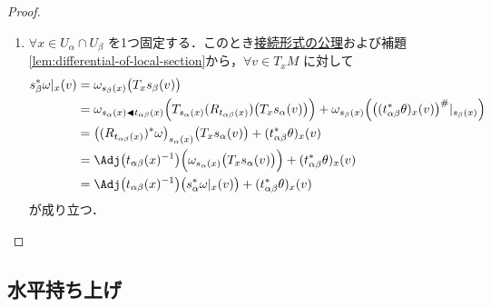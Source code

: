 \documentclass[TQFT_main]{subfiles}
\begin{document}
\begin{proof}
\begin{enumerate}
        \item $\forall x \in U_\alpha \cap U_\beta$ を1つ固定する．このとき\hyperref[def:connection]{接続形式の公理}および補題\ref{lem:differential-of-local-section}から，$\forall v \in T_x M$ に対して
        \begin{align}
            s_\beta^* \omega|_x (v) 
            &= \omega_{s_\beta(x)} \bigl( T_x s_\beta (v) \bigr) \\
            &= \omega_{s_\alpha(x) \btl t_{\alpha\beta}(x)} \Bigl( T_{s_\alpha(x)} (R_{t_{\alpha\beta}(x)}) \bigl( T_x s_\alpha(v) \bigr)\Bigr) + \omega_{s_\beta(x)}\Bigl( \bigl( (t_{\alpha\beta}^* \theta)_x (v) \bigr)^\#|_{s_\beta(x)} \Bigr) \\
            &= \bigl((R_{t_{\alpha\beta}(x)})^* \omega\bigr)_{s_\alpha(x)} \bigl( T_x s_\alpha(v) \bigr) + (t_{\alpha\beta}^* \theta)_x (v) \\
            &= \Adj \bigl( t_{\alpha\beta}(x)^{-1} \bigr) \Bigl( \omega_{s_\alpha(x)} \bigl( T_x s_\alpha (v) \bigr) \Bigr)  + (t_{\alpha\beta}^* \theta)_x (v) \\
            &= \Adj \bigl( t_{\alpha\beta}(x)^{-1} \bigr) \bigl( s_\alpha^* \omega|_x (v) \bigr)  + (t_{\alpha\beta}^* \theta)_x (v)
        \end{align}
        が成り立つ．
    \end{enumerate}
\end{proof}




\subsection{水平持ち上げ}
\end{document}
